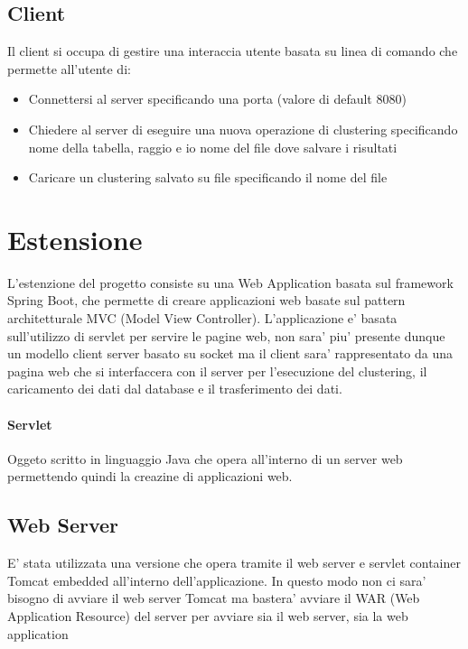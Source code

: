 \documentclass{article}
\begin{document}
        \subsection{Client}
        Il client si occupa di gestire una interaccia utente basata su linea di 
        comando che permette all'utente di:
            \begin{itemize}
                \item Connettersi al server specificando una porta (valore di 
                default 8080)
                \item Chiedere al server di eseguire una nuova operazione di
                clustering specificando nome della tabella, raggio e io nome del
                file dove salvare i risultati
                \item Caricare un clustering salvato su file specificando il
                nome del file
            \end{itemize}


    \section{Estensione}
    L'estenzione del progetto consiste su una Web Application basata sul
    framework Spring Boot, che permette di creare applicazioni web basate sul
    pattern architetturale MVC (Model View Controller). 
    L'applicazione e' basata sull'utilizzo di servlet per servire le pagine web,
    non sara' piu' presente dunque un modello client server basato su socket ma 
    il client sara' rappresentato da una pagina web che si interfaccera con il
    server per l'esecuzione del clustering, il caricamento dei dati dal database 
    e il trasferimento dei dati.

        \paragraph{Servlet}
        Oggeto scritto in linguaggio Java che opera all'interno di
        un server web permettendo quindi la creazine di applicazioni web.
    
        \subsection{Web Server}
        E' stata utilizzata una versione che opera tramite il web server e 
        servlet container Tomcat embedded all'interno dell'applicazione. 
        In questo modo non ci sara' bisogno di avviare il web server Tomcat ma 
        bastera' avviare il WAR (Web Application Resource) del server per 
        avviare sia il web server, sia la web application
\end{document}
